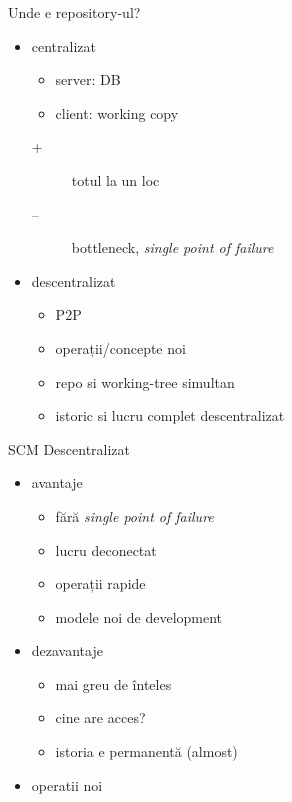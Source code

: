 \documentclass{beamer}
\begin{document}
\begin{frame}{Unde e repository-ul?}
  \begin{itemize}
    \item centralizat
      \begin{itemize}
        \item server: DB
        \item client: working copy
      \end{itemize}
      \pause
      \begin{description}
        \item[+] totul la un loc
        \item[--] bottleneck, \textit{single point of failure}
      \end{description}
    \pause
    \item descentralizat
      \begin{itemize}
        \item P2P
        \item operații/concepte noi
        \item repo si working-tree simultan
        \item istoric si lucru complet descentralizat
      \end{itemize}
  \end{itemize}
\end{frame}

\begin{frame}{SCM Descentralizat}
  \begin{itemize}
    \item avantaje
      \begin{itemize}
        \item fără \textit{single point of failure}
        \item lucru deconectat
        \item operații rapide
        \item modele noi de development
      \end{itemize}
    \pause
    \item dezavantaje
      \begin{itemize}
        \item mai greu de înteles
        \item cine are acces?
        \item istoria e permanentă (almost)
      \end{itemize}
    \pause
    \item operatii noi
  \end{itemize}
\end{frame}
\end{document}
